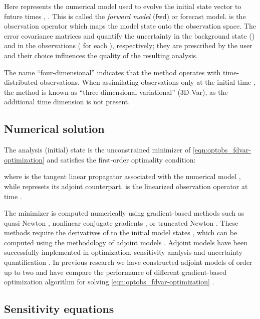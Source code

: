 \documentclass{article}
\begin{document}
Here  represents the numerical model used to evolve the initial state vector  to future times , . 
This is called the {\em forward model} ({\sc fwd}) or forecast model. 
 is the observation operator 
which maps the model state  onto the observation space. 
The error covariance matrices  and  quantify the uncertainty in the background state () and in the observations
( for each ), respectively; they are prescribed by the user and their choice influences the quality of the resulting analysis. 


The name ``four-dimensional'' indicates that the method operates with time-distributed observations.
When assimilating observations only at the initial time , the method is known as ``three-dimensional variational''
(3D-Var), as the additional time dimension is not present. 




\subsection{Numerical solution}


The analysis (initial) state  is the unconstrained minimizer of \eqref{eqn:optobs_fdvar-optimization} and satisfies the first-order optimality condition:

where  is the tangent linear propagator associated with the 
numerical model , while  represets its adjoint counterpart.
 is the linearized observation operator at time . 

The minimizer  is computed numerically using gradient-based methods such as
quasi-Newton \cite{dennis1977quasi}, nonlinear conjugate gradients \cite{dai1999nonlinear}, or truncated Newton \cite{schlick1992tnpack}.
These methods require the derivatives of  to the initial model states ,
which can be computed using the methodology of adjoint models \cite{cacuci1981sensitivity,Wang_1992}.
Adjoint models have been successfully implemented in optimization, sensitivity analysis and uncertainty quantification
\cite{sandu2008discrete,SanduADJ_2005,Cioaca_2011}.
In previous research we have constructed adjoint models of order up to two and have
compare the performance of different gradient-based optimization algorithm for solving \eqref{eqn:optobs_fdvar-optimization} \cite{Cioaca_2011}.

\subsection{Sensitivity equations}
\end{document}
